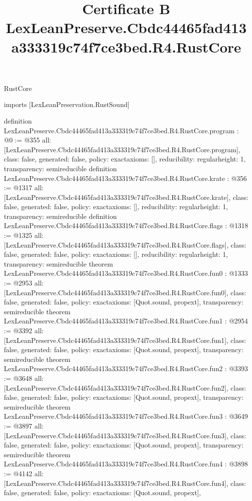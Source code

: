 \begin{lexlean}{RustCore}
\title{Certificate B LexLeanPreserve.Cbdc44465fad413a333319c74f7ce3bed.R4.RustCore}
\begin{coremodule}
imports [LexLeanPreservation.RustSound]

definition LexLeanPreserve.Cbdc44465fad413a333319c74f7ce3bed.R4.RustCore.program : @0 := @355 {
  all: [LexLeanPreserve.Cbdc44465fad413a333319c74f7ce3bed.R4.RustCore.program],
  class: false,
  generated: false,
  policy: exact{axioms: []},
  reducibility: regular{height: 1},
  transparency: semireducible
}
definition LexLeanPreserve.Cbdc44465fad413a333319c74f7ce3bed.R4.RustCore.krate : @356 := @1317 {
  all: [LexLeanPreserve.Cbdc44465fad413a333319c74f7ce3bed.R4.RustCore.krate],
  class: false,
  generated: false,
  policy: exact{axioms: []},
  reducibility: regular{height: 1},
  transparency: semireducible
}
definition LexLeanPreserve.Cbdc44465fad413a333319c74f7ce3bed.R4.RustCore.flags : @1318 := @1325 {
  all: [LexLeanPreserve.Cbdc44465fad413a333319c74f7ce3bed.R4.RustCore.flags],
  class: false,
  generated: false,
  policy: exact{axioms: []},
  reducibility: regular{height: 1},
  transparency: semireducible
}
theorem LexLeanPreserve.Cbdc44465fad413a333319c74f7ce3bed.R4.RustCore.fun0 : @1333 := @2953 {
  all: [LexLeanPreserve.Cbdc44465fad413a333319c74f7ce3bed.R4.RustCore.fun0],
  class: false,
  generated: false,
  policy: exact{axioms: [Quot.sound, propext]},
  transparency: semireducible
}
theorem LexLeanPreserve.Cbdc44465fad413a333319c74f7ce3bed.R4.RustCore.fun1 : @2954 := @3392 {
  all: [LexLeanPreserve.Cbdc44465fad413a333319c74f7ce3bed.R4.RustCore.fun1],
  class: false,
  generated: false,
  policy: exact{axioms: [Quot.sound, propext]},
  transparency: semireducible
}
theorem LexLeanPreserve.Cbdc44465fad413a333319c74f7ce3bed.R4.RustCore.fun2 : @3393 := @3648 {
  all: [LexLeanPreserve.Cbdc44465fad413a333319c74f7ce3bed.R4.RustCore.fun2],
  class: false,
  generated: false,
  policy: exact{axioms: [Quot.sound, propext]},
  transparency: semireducible
}
theorem LexLeanPreserve.Cbdc44465fad413a333319c74f7ce3bed.R4.RustCore.fun3 : @3649 := @3897 {
  all: [LexLeanPreserve.Cbdc44465fad413a333319c74f7ce3bed.R4.RustCore.fun3],
  class: false,
  generated: false,
  policy: exact{axioms: [Quot.sound, propext]},
  transparency: semireducible
}
theorem LexLeanPreserve.Cbdc44465fad413a333319c74f7ce3bed.R4.RustCore.fun4 : @3898 := @4142 {
  all: [LexLeanPreserve.Cbdc44465fad413a333319c74f7ce3bed.R4.RustCore.fun4],
  class: false,
  generated: false,
  policy: exact{axioms: [Quot.sound, propext]},
}
\end{coremodule}
\end{lexlean}
